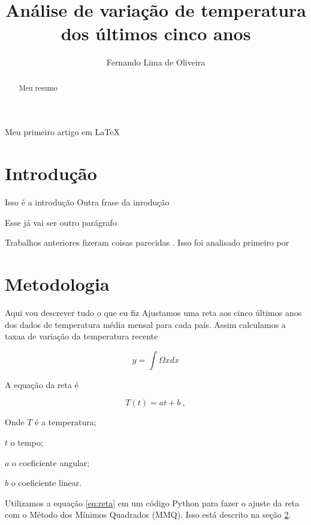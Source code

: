 \documentclass{article}
\begin{document}
\title{Análise de variação de temperatura dos últimos cinco anos}
\author{Fernando Lima de Oliveira}
\maketitle

\begin{abstract}
Meu resumo
\end{abstract}

Meu primeiro artigo em LaTeX


\section{Introdução}

Isso é a introdução
Outra frase da inrodução

Esse já vai ser outro parágrafo

Trabalhos anteriores fizeram coisas parecidas
\citep{Hansen2010}.
Isso foi analisado primeiro por \citet{Hansen2010}

\section{Metodologia}
\label{sec:metodos}

	Aqui vou descrever tudo o que eu fiz
Ajustamos uma reta aos cinco últimos anos dos dados
de temperatura média mensal para cada país.
Assim calculamos a taxaa de variação da temperatura recente

\begin{equation}
y = \int \Omega x dx
\end{equation}

A equação da reta é

\begin{equation}
T(t) = a t + b \ ,
\label{eq:reta}
\end{equation}

\noindent
Onde $T$ é a temperatura; 

\noindent
$t$ o tempo; 

\noindent
$a$ o coeficiente angular; 

\noindent
$b$ o coeficiente linear.

	Utilizamos a equação \ref{eq:reta} em um código Python para fazer o ajuste da reta com 
o Método dos Mínimos Quadrados (MMQ). Isso está descrito na seção \ref{sec:metodos}.
\end{document}
